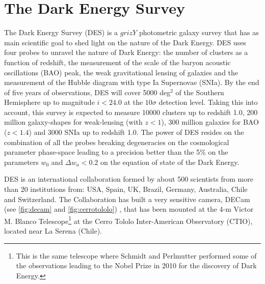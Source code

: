 \chapter{The Dark Energy Survey}
\label{ch:DES}

The Dark Energy Survey (DES) \cite{2005astro.ph.10346T} is a $grizY$ photometric galaxy survey that has as main scientific goal to shed light on the nature of the Dark Energy. DES uses four probes to unravel the nature of Dark Energy: the number of clusters as a function of redshift, the measurement of the scale of the baryon acoustic oscillations (BAO) peak, the weak gravitational lensing of galaxies and the measurement of the Hubble diagram with type Ia Supernovae (SNIa). By the end of five years of observations, DES will cover 5000 deg$^2$ of the Southern Hemisphere up to magnitude $i<24.0$ at the $10\sigma$ detection level. Taking this into account, this survey is expected to measure 10000 clusters up to redshift 1.0, 200 million galaxy-shapes for weak-lensing (with $z<1$), 300 million galaxies for BAO ($z<1.4$) and 3000 SNIa up to redshift 1.0. The power of DES resides on the combination of all the probes breaking degeneracies on the cosmological parameter phase-space leading to a precision better than the 5\% on the parameters $w_0$ and $\Delta w_a<0.2$ on the equation of state of the Dark Energy.
\newline

DES is an international collaboration formed by about 500 scientists from more than 20 institutions from: USA, Spain, UK, Brazil, Germany, Australia, Chile and Switzerland. The Collaboration has built a very sensitive camera, DECam (see \autoref{fig:decam} and \autoref{fig:cerrotololo}) \cite{DIEHL20121332}, that has been mounted at the 4-m Victor M. Blanco Telescope\footnote{This is the same telescope where Schmidt and Perlmutter performed some of the observations leading to the Nobel Prize in 2010 for the discovery of Dark Energy.} at the Cerro Tololo Inter-American Observatory (CTIO), located near La Serena (Chile).

